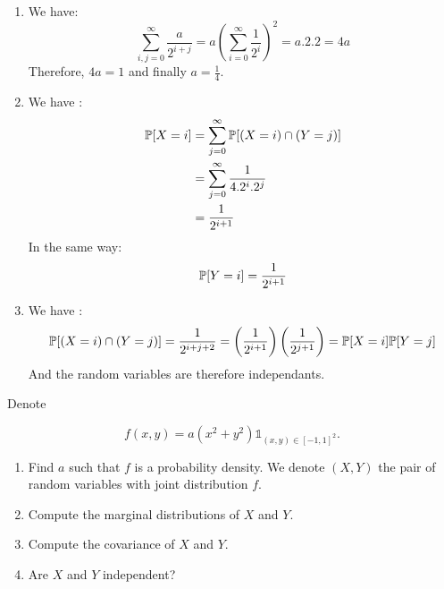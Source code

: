 \begin{solution}
  \begin{enumerate}
    \item We have:
          \[
            \sum_{i, j = 0}^\infty \frac{a}{2^{i+j}} = a {\left( \sum_{i =
                  0}^\infty \frac{1}{2^i} \right)}^2 = a.2.2 = 4a
          \]
          Therefore, $4a = 1$ and finally $a = \frac{1}{4}$.
    \item We have :
          \begin{align*}
            \mathbb{P}[X = i] & = \sum_{j = 0}^\infty \mathbb{P}[(X = i) \cap (Y = j)] \\
                          & = \sum_{j = 0}^\infty \frac{1}{4.2^i.2^j}          \\
                          & = \frac{1}{2^{i+1}}
          \end{align*}
          In the same way:
          $$ \mathbb{P}[Y = i] = \frac{1}{2^{i+1}} $$
    \item We have : $$ \mathbb{P}[(X = i) \cap (Y = j)] = \frac{1}{2^{i+j+2}} =
            \left(\frac{1}{2^{i+1}} \right) \left(\frac{1}{2^{j+1}} \right) = \mathbb{P}[X = i]
            \mathbb{P}[Y = j] $$ And the random variables are therefore independants.
  \end{enumerate}
\end{solution}

\begin{Exercise}
  Denote

  $$
    f(x, y)=a\left(x^{2}+y^{2}\right) \mathbb{1}_{(x, y) \in[-1,1]^{2}} .
  $$

  \begin{enumerate}
    \item Find $a$ such that $f$ is a probability density. We denote $(X, Y)$ the pair of
          random variables with joint distribution $f$.

    \item Compute the marginal distributions of $X$ and $Y$.

    \item Compute the covariance of $X$ and $Y$.

    \item Are $X$ and $Y$ independent?

  \end{enumerate}
\end{Exercise}

